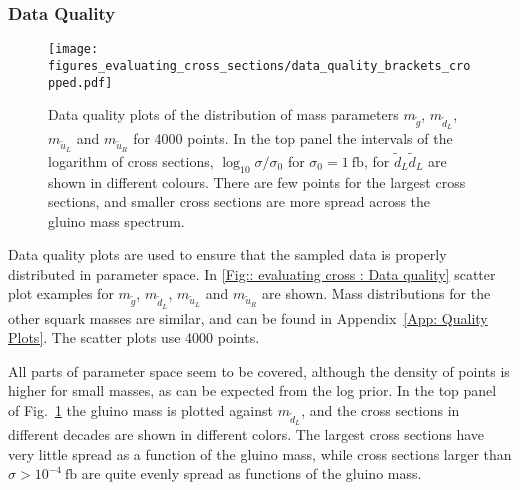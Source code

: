 \documentclass[twoside,english]{uiofysmaster}
\begin{document}
{{\subsubsection{Data Quality}\label{Sec:: evaluating cross : Data Quality}

\begin{figure}
\centering
\texttt{[image: figures\_evaluating\_cross\_sections/data\_quality\_brackets\_cropped.pdf]}
\caption{Data quality plots of the distribution of mass parameters $m_{\widetilde{g}}$, $m_{\widetilde{d}_L}$, $m_{\widetilde{u}_L}$ and $m_{\widetilde{u}_R}$ for 4000 points. In the top panel the intervals of the logarithm of cross sections, $ \log_{10} \sigma/\sigma_0$ for $\sigma_0 = 1~\mathrm{fb}$, for $\widetilde{d}_L \widetilde{d}_L$ are shown in different colours. There are few points for the largest cross sections, and smaller cross sections are more spread across the gluino mass spectrum. }
\label{Fig:: evaluating cross : Data quality}
\end{figure}

Data quality plots are used to ensure that the sampled data is properly distributed in parameter space. In \autoref{Fig:: evaluating cross : Data quality} scatter plot examples for $m_{\widetilde{g}}$, $m_{\widetilde{d}_L}$, $m_{\widetilde{u}_L}$ and $m_{\widetilde{u}_R}$ are shown. Mass distributions for the other squark masses are similar, and can be found in Appendix~\ref{App: Quality Plots}. The scatter plots use 4000 points. 

All parts of parameter space seem to be covered, although the density of points is higher for small masses, as can be expected from the log prior. In the top panel of Fig.~\ref{Fig:: evaluating cross : Data quality} the gluino mass is plotted against $m_{\widetilde{d}_L}$, and the cross sections in different decades are shown in different colors. The largest cross sections have very little spread as a function of the gluino mass, while cross sections larger than $\sigma > 10^{-4}~\mathrm{fb}$ are quite evenly spread as functions of the gluino mass.


}}
\end{document}
